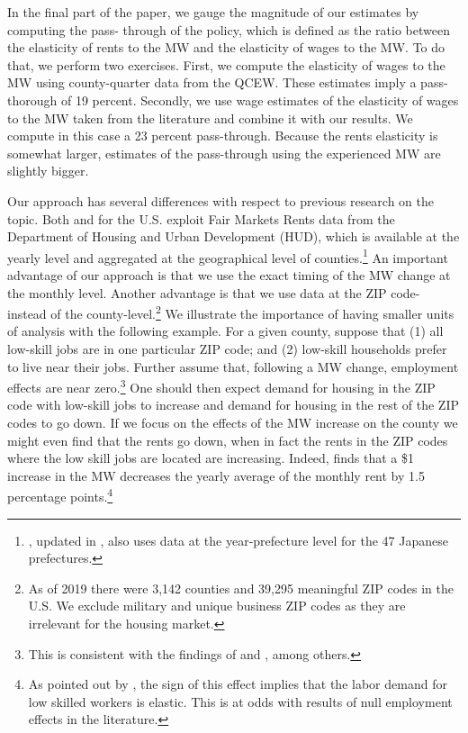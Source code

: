 In the final part of the paper, we gauge the magnitude of our estimates by computing the pass-
through of the policy, which is defined as the ratio between the elasticity of rents to the MW 
and the elasticity of wages to the MW. To do that, we perform two exercises. First, we compute
the elasticity of wages to the MW using county-quarter data from the QCEW. These estimates
imply a pass-thorough of 19 percent. Secondly, we use wage estimates of the elasticity of wages 
to the MW taken from the literature and combine it with our results. We compute in this case a 
23 percent pass-through. Because the rents elasticity is somewhat larger, estimates of the 
pass-through using the experienced MW are slightly bigger.

Our approach has several differences with respect to previous research on the topic. Both 
\textcite{Tidemann2018} and \textcite{Yamagishi2019} for the U.S. exploit Fair Markets Rents data 
from the Department of Housing and Urban Development (HUD), which is available at the yearly 
level and aggregated at the geographical level of counties.\footnote{\textcite{Yamagishi2019}, 
	updated in \textcite{Yamagishi2020}, also uses data at the year-prefecture level for the 47 
	Japanese prefectures.}
An important advantage of our approach is that we use the exact timing of the MW change at 
the monthly level. 
Another advantage is that we use data at the ZIP code- instead of the county-level.\footnote{
	As of 2019 there were 3,142 counties and 39,295 meaningful ZIP codes in the U.S. We exclude 
	military and unique business ZIP codes as they are irrelevant for the housing market.} 
We illustrate the importance of having smaller units of analysis with the following example. 
For a given county, suppose that (1) all low-skill jobs are in one particular ZIP code; and 
(2) low-skill households prefer to live near their jobs. Further assume that, following a MW 
change, employment effects are near zero.\footnote{This is consistent with the findings of 
	\textcite{CardKrueger2000} and \textcite{CegnizEtAl2019}, among others.} 
One should then expect demand for housing in the ZIP code with low-skill jobs to increase and 
demand for housing in the rest of the ZIP codes to go down. If we focus on the effects of the 
MW increase on the county we might even find that the rents go down, when in fact the rents in 
the ZIP codes where the low skill jobs are located are increasing. Indeed, \textcite{Tidemann2018} 
finds that a \$1 increase in the MW decreases the yearly average of the monthly rent by 1.5 
percentage points.\footnote{As pointed out by \textcite{Tidemann2018}, the sign of this 
	effect 	implies that the labor demand for low skilled workers is elastic. This is at 
	odds with results of null employment effects in the literature.} 

